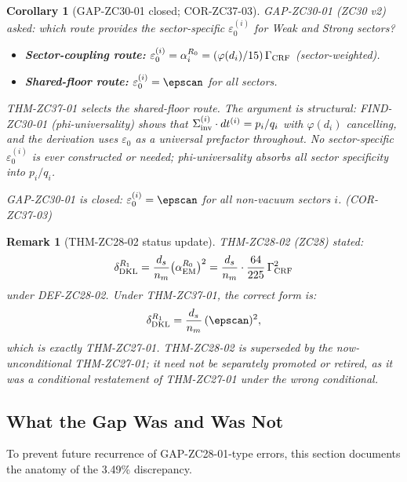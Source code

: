\documentclass[12pt, a4paper]{article}
\newtheorem{corollary}{Corollary}[section]
\newtheorem{remark}{Remark}[section]
\begin{document}
\begin{corollary}[GAP-ZC30-01 closed; COR-ZC37-03]
\label{cor:gap-zc30-01}
GAP-ZC30-01 (ZC30 v2) asked: which route provides the
sector-specific $\varepsilon_0^{(i)}$ for Weak and Strong
sectors?
\begin{itemize}[leftmargin=*, noitemsep]
  \item \textbf{Sector-coupling route:}
    $\varepsilon_0^{(i)} = \alpha_i^{R_0} = (\varphi(d_i)/15)
    \,\Gamma_{\rm CRF}$ (sector-weighted).
  \item \textbf{Shared-floor route:}
    $\varepsilon_0^{(i)} = \epscan$ for all sectors.
\end{itemize}

THM-ZC37-01 selects the shared-floor route.
The argument is structural: FIND-ZC30-01 (phi-universality)
shows that $\Sigma_{\rm inv}^{(i)}\cdot dt^{(i)} = p_i/q_i$
with $\varphi(d_i)$ cancelling, and the derivation uses
$\varepsilon_0$ as a universal prefactor throughout.
No sector-specific $\varepsilon_0^{(i)}$ is ever constructed
or needed; phi-universality absorbs all sector specificity
into $p_i/q_i$.

GAP-ZC30-01 is closed: $\varepsilon_0^{(i)} = \epscan$
for all non-vacuum sectors $i$.
\hfill\textup{(COR-ZC37-03)}
\end{corollary}

\begin{remark}[THM-ZC28-02 status update]
THM-ZC28-02 (ZC28) stated:
\[
  \delta_{\rm DKL}^{R_1}
  = \frac{d_s}{n_m}\bigl(\alpha_{\rm EM}^{R_0}\bigr)^2
  = \frac{d_s}{n_m}\cdot\frac{64}{225}\,\Gamma_{\rm CRF}^2
\]
under DEF-ZC28-02. Under THM-ZC37-01, the correct form is:
\[
  \delta_{\rm DKL}^{R_1}
  = \frac{d_s}{n_m}\,(\epscan)^2,
\]
which is exactly THM-ZC27-01. THM-ZC28-02 is superseded
by the now-unconditional THM-ZC27-01; it need not be
separately promoted or retired, as it was a conditional
restatement of THM-ZC27-01 under the wrong conditional.
\end{remark}

\subsection{What the Gap Was and Was Not}
\label{sec:anatomy}

To prevent future recurrence of GAP-ZC28-01-type errors,
this section documents the anatomy of the 3.49\% discrepancy.
\end{document}
